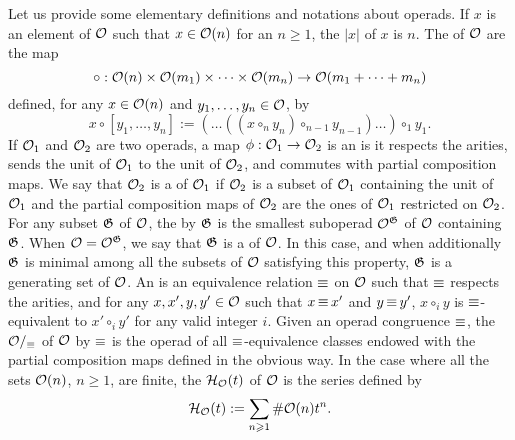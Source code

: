 Let us provide some elementary definitions and notations about operads.
If $x$ is an element of $\mathcal{O}$ such that $x \in \mathcal{O}(n)$ for an
$n \geq 1$, the  $|x|$ of $x$ is $n$. The
 of $\mathcal{O}$ are the map
\begin{equation}
    \circ : \mathcal{O}(n) \times \mathcal{O}(m_1) \times \dots \times \mathcal{O}(m_n)
    \to \mathcal{O}(m_1 + \dots + m_n)
\end{equation}
defined, for any $x \in \mathcal{O}(n)$ and $y_1, \dots, y_n \in \mathcal{O}$, by
\begin{equation}
    x \circ [y_1, \dots, y_n] :=
    (\dots ((x \circ_n y_n) \circ_{n - 1} y_{n - 1}) \dots) \circ_1 y_1.
\end{equation}
If $\mathcal{O}_1$ and $\mathcal{O}_2$ are two operads, a map
$\phi : \mathcal{O}_1 \to \mathcal{O}_2$ is an  is it respects
the arities, sends the unit of $\mathcal{O}_1$ to the unit of $\mathcal{O}_2$, and
commutes with partial composition maps. We say that $\mathcal{O}_2$ is a
 of $\mathcal{O}_1$ if $\mathcal{O}_2$ is a subset of $\mathcal{O}_1$
containing the unit of $\mathcal{O}_1$ and the partial composition maps of
$\mathcal{O}_2$ are the ones of $\mathcal{O}_1$ restricted on $\mathcal{O}_2$. For any subset
$\mathfrak{G}$ of $\mathcal{O}$, the  by
$\mathfrak{G}$ is the smallest suboperad $\mathcal{O}^{\mathfrak{G}}$ of
$\mathcal{O}$ containing $\mathfrak{G}$. When $\mathcal{O} = \mathcal{O}^{\mathfrak{G}}$,
we say that $\mathfrak{G}$ is a  of $\mathcal{O}$. In
this case, and when additionally $\mathfrak{G}$ is minimal among all
the subsets of $\mathcal{O}$ satisfying this property, $\mathfrak{G}$ is a
 generating set of $\mathcal{O}$. An  is an
equivalence relation $\operatorname{\equiv}$ on $\mathcal{O}$ such that $\operatorname{\equiv}$ respects the
arities, and for any $x, x', y, y' \in \mathcal{O}$ such that $x \operatorname{\equiv} x'$ and
$y \operatorname{\equiv} y'$, $x \circ_i y$ is $\operatorname{\equiv}$-equivalent to $x' \circ_i y'$
for any valid integer $i$. Given an operad congruence $\operatorname{\equiv}$, the
 $\mathcal{O}/_{\operatorname{\equiv}}$ of $\mathcal{O}$ by $\operatorname{\equiv}$ is the
operad of all $\operatorname{\equiv}$-equivalence classes endowed with the partial
composition maps defined in the obvious way. In the case where all the
sets $\mathcal{O}(n)$, $n \geq 1$, are finite, the 
$\mathcal{H}_{\mathcal{O}}(t)$ of $\mathcal{O}$ is the series defined by
\begin{equation}
    \mathcal{H}_{\mathcal{O}}(t) := \sum_{n \geqslant 1} \# \mathcal{O}(n) t^n.
\end{equation}
\medbreak

